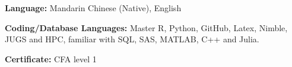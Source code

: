 

\begin{cvparagraph}

\textbf{Language:} Mandarin Chinese (Native), English

\textbf{Coding/Database Languages:} Master R, Python, GitHub, Latex, Nimble, JUGS and HPC, familiar with SQL, SAS, MATLAB, C++ and Julia.

\textbf{Certificate:} CFA level 1

\end{cvparagraph}
